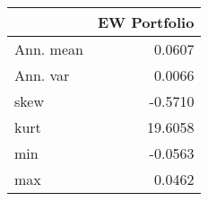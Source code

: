 \begin{tabular}{lr}
\toprule
{} &  EW Portfolio \\
\midrule
Ann. mean &        0.0607 \\
Ann. var  &        0.0066 \\
skew      &       -0.5710 \\
kurt      &       19.6058 \\
min       &       -0.0563 \\
max       &        0.0462 \\
\bottomrule
\end{tabular}
